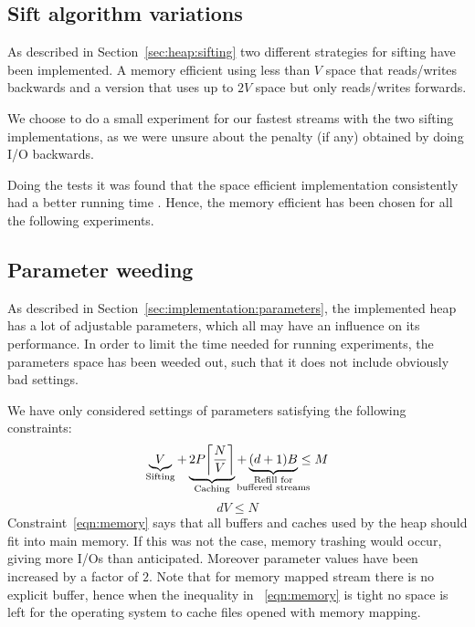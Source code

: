 
\subsection{Sift algorithm variations}
As described in Section~\ref{sec:heap:sifting} two different strategies for sifting have been implemented. A memory efficient using less than $V$ space that reads/writes backwards and a version that uses up to $2V$ space but only reads/writes forwards.

We choose to do a small experiment  for our fastest streams with the two sifting implementations, as we were unsure about the penalty (if any) obtained by doing I/O backwards.

Doing the tests it was found that the space efficient implementation consistently had a better running time . Hence, the memory efficient has been chosen for all the following experiments.

\subsection{Parameter weeding}
As described in Section~\ref{sec:implementation:parameters}, the implemented heap has a lot of adjustable parameters, which all may have an influence on its performance. In order to limit the time needed for running experiments, the parameters space has been weeded out, such that it does not include obviously bad settings.

We have only considered settings of parameters satisfying the following constraints:
\begin{equation}
  \label{eqn:memory}
  \underbrace{V}_{\textrm{Sifting}} + \underbrace{2P \ceil*{\frac{N}{V}}}_{\textrm{Caching}} + \underbrace{(d + 1)B}_{\mathclap{\substack{
  \textrm{Refill for}\\\textrm{buffered streams}
  }}} \leq M
\end{equation}
\begin{equation}
  \label{eqn:dvn}
  dV\leq N
\end{equation}
Constraint~\ref{eqn:memory} says that all buffers and caches used by the heap should fit into main memory. If this was not the case, memory trashing would occur, giving more I/Os than anticipated. Moreover parameter values have been increased by a factor of $2$. Note that for memory mapped stream there is no explicit buffer, hence when the inequality in ~\ref{eqn:memory} is tight no space is left for the operating system to cache files opened with memory mapping.

